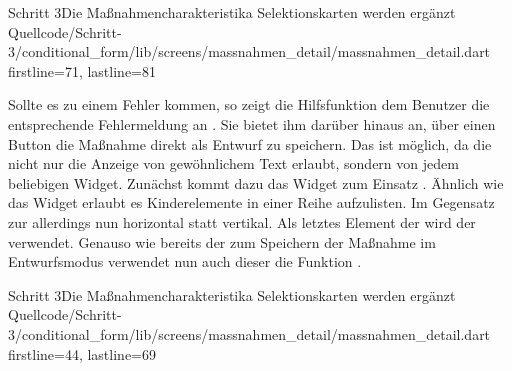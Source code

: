 \begin{alexlisting}{Schritt 3}{Die Maßnahmencharakteristika Selektionskarten werden ergänzt}
    {Quellcode/Schritt-3/conditional_form/lib/screens/massnahmen_detail/massnahmen_detail.dart}
    {firstline=71, lastline=81}
    \label{lst:Schritt3inputsAreValidOrNotMarkedFinal}
\end{alexlisting}

Sollte es zu einem Fehler kommen, so zeigt die Hilfsfunktion  dem Benutzer die entsprechende Fehlermeldung an \Lst{\ref{lst:Schritt3showValidationError}}. Sie bietet ihm darüber hinaus an, über einen Button die Maßnahme direkt als Entwurf zu speichern. Das ist möglich, da die   nicht nur die Anzeige von gewöhnlichem Text erlaubt, sondern von jedem beliebigen Widget. Zunächst kommt dazu das Widget  zum Einsatz . Ähnlich wie das Widget  erlaubt es Kinderelemente in einer Reihe aufzulisten. Im Gegensatz zur  allerdings nun horizontal statt vertikal. Als letztes Element der  wird der   verwendet. Genauso wie bereits der  zum Speichern der Maßnahme im Entwurfsmodus verwendet nun auch dieser  die Funktion  .

\begin{alexlisting}{Schritt 3}{Die Maßnahmencharakteristika Selektionskarten werden ergänzt}
    {Quellcode/Schritt-3/conditional_form/lib/screens/massnahmen_detail/massnahmen_detail.dart}
    {firstline=44, lastline=69}
    \label{lst:Schritt3showValidationError}
\end{alexlisting}




\clearpage 
